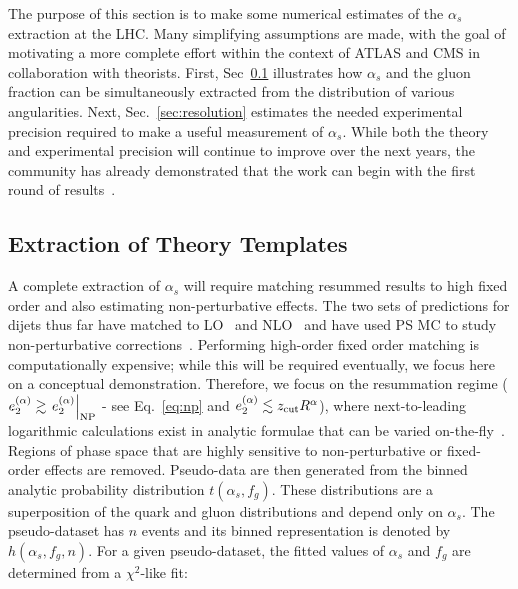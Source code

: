
The purpose of this section is to make some numerical estimates of the $\alpha_s$ extraction at the LHC.  Many simplifying assumptions are made, with the goal of motivating a more complete effort within the context of ATLAS and CMS in collaboration with theorists.   First, Sec~\ref{sec:templates} illustrates how $\alpha_s$ and the gluon fraction can be simultaneously extracted from the distribution of various angularities.  Next, Sec.~\ref{sec:resolution} estimates the needed experimental precision required to make a useful measurement of $\alpha_s$.   While both the theory and experimental precision will continue to improve over the next years, the community has already demonstrated that the work can begin with the first round of results~\cite{Aaboud:2017qwh,CMS-PAS-SMP-16-010,Frye:2016aiz,Frye:2016okc,Marzani:2017mva,Marzani:2017kqd}.

\subsection{Extraction of Theory Templates}
\label{sec:templates}

A complete extraction of $\alpha_s$ will require matching resummed results to high fixed order and also estimating non-perturbative effects.  The two sets of predictions for dijets thus far have matched to LO~\cite{Frye:2016aiz,Frye:2016okc} and NLO~\cite{Marzani:2017mva,Marzani:2017kqd} and have used PS MC to study non-perturbative corrections~\cite{Marzani:2017mva,Marzani:2017kqd}.  Performing high-order fixed order matching is computationally expensive; while this will be required eventually, we focus here on a conceptual demonstration.  Therefore, we focus on the resummation regime ($e_{2}^{(\alpha)}\gtrsim \left. e_{2}^{(\alpha)} \right |_{\text{NP}}$ - see Eq.~\ref{eq:np} and $e_{2}^{(\alpha)}\lesssim z_\text{cut}R^\alpha$), where next-to-leading logarithmic calculations exist in analytic formulae that can be varied on-the-fly~\cite{Marzani:2017mva,Marzani:2017kqd}.  Regions of phase space that are highly sensitive to non-perturbative or fixed-order effects are removed.  Pseudo-data are then generated from the binned analytic probability distribution $t(\alpha_s,f_g)$.  These distributions are a superposition of the quark and gluon distributions and depend only on $\alpha_s$.  The pseudo-dataset has $n$ events and its binned representation is denoted by  $h(\alpha_s,f_g,n)$.  For a given pseudo-dataset, the fitted values of $\alpha_s$ and $f_g$ are determined from a $\chi^2$-like fit:

